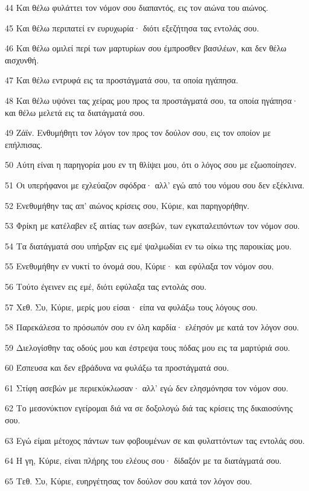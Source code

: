 \par 44 Και θέλω φυλάττει τον νόμον σου διαπαντός, εις τον αιώνα του αιώνος.
\par 45 Και θέλω περιπατεί εν ευρυχωρία· διότι εξεζήτησα τας εντολάς σου.
\par 46 Και θέλω ομιλεί περί των μαρτυρίων σου έμπροσθεν βασιλέων, και δεν θέλω αισχυνθή.
\par 47 Και θέλω εντρυφά εις τα προστάγματά σου, τα οποία ηγάπησα.
\par 48 Και θέλω υψόνει τας χείρας μου προς τα προστάγματά σου, τα οποία ηγάπησα· και θέλω μελετά εις τα διατάγματά σου.
\par 49 Ζάϊν. Ενθυμήθητι τον λόγον τον προς τον δούλον σου, εις τον οποίον με επήλπισας.
\par 50 Αύτη είναι η παρηγορία μου εν τη θλίψει μου, ότι ο λόγος σου με εζωοποίησεν.
\par 51 Οι υπερήφανοι με εχλεύαζον σφόδρα· αλλ' εγώ από του νόμου σου δεν εξέκλινα.
\par 52 Ενεθυμήθην τας απ' αιώνος κρίσεις σου, Κύριε, και παρηγορήθην.
\par 53 Φρίκη με κατέλαβεν εξ αιτίας των ασεβών, των εγκαταλειπόντων τον νόμον σου.
\par 54 Τα διατάγματά σου υπήρξαν εις εμέ ψαλμωδίαι εν τω οίκω της παροικίας μου.
\par 55 Ενεθυμήθην εν νυκτί το όνομά σου, Κύριε· και εφύλαξα τον νόμον σου.
\par 56 Τούτο έγεινεν εις εμέ, διότι εφύλαξα τας εντολάς σου.
\par 57 Χεθ. Συ, Κύριε, μερίς μου είσαι· είπα να φυλάξω τους λόγους σου.
\par 58 Παρεκάλεσα το πρόσωπόν σου εν όλη καρδία· ελέησόν με κατά τον λόγον σου.
\par 59 Διελογίσθην τας οδούς μου και έστρεψα τους πόδας μου εις τα μαρτύριά σου.
\par 60 Έσπευσα και δεν εβράδυνα να φυλάξω τα προστάγματά σου.
\par 61 Στίφη ασεβών με περιεκύκλωσαν· αλλ' εγώ δεν ελησμόνησα τον νόμον σου.
\par 62 Το μεσονύκτιον εγείρομαι διά να σε δοξολογώ διά τας κρίσεις της δικαιοσύνης σου.
\par 63 Εγώ είμαι μέτοχος πάντων των φοβουμένων σε και φυλαττόντων τας εντολάς σου.
\par 64 Η γη, Κύριε, είναι πλήρης του ελέους σου· δίδαξόν με τα διατάγματά σου.
\par 65 Τεθ. Συ, Κύριε, ευηργέτησας τον δούλον σου κατά τον λόγον σου.

